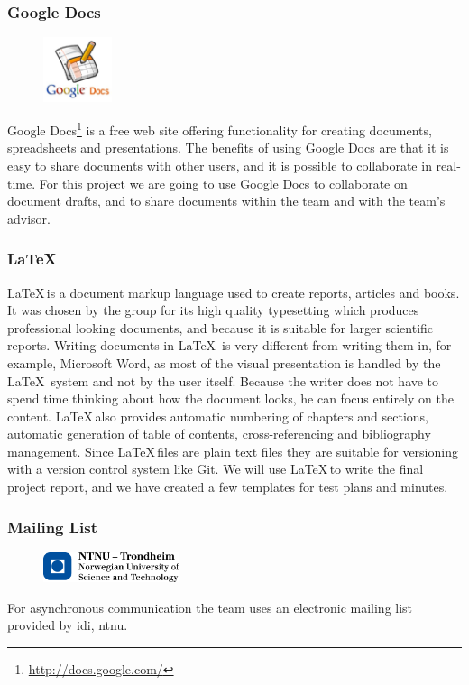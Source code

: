 \subsubsection{Google Docs}
\begin{figure}
	\vspace{-20pt}
	\includegraphics[width=2cm]{./planning/img/google_docs_logo}
	\vspace{-20pt}
\end{figure}
Google Docs\footnote{\url{http://docs.google.com/}} is a free web site offering
functionality for creating documents, spreadsheets and presentations.
The benefits of using Google Docs are that it is easy to share documents with other users, and
it is possible to collaborate in real-time. For this project we are going to use Google Docs
to collaborate on document drafts, and to share documents within the team and
with the team's advisor.

\subsubsection{\LaTeX}
\LaTeX \,is a document \gls{markup language} used to
create reports, articles and books. It was chosen by the group for its 
high quality typesetting which produces professional looking documents, and 
because it is suitable for larger scientific reports. 
Writing documents in \LaTeX \ is very different from writing them in, for example,
Microsoft Word, as most of the visual presentation is handled by the \LaTeX \ system 
and not by the user itself. Because the writer does not have to spend time
thinking about how the document looks, he can focus entirely on the content.
\LaTeX \,also provides automatic numbering of chapters and sections,
automatic generation of table of contents, cross-referencing and bibliography
management. Since \LaTeX \,files are plain text files they are suitable for versioning 
with a \gls{version control system} like Git. We will use \LaTeX \,to write the final project 
report, and we have created a few templates for test plans and minutes.

\subsubsection{Mailing List}
\begin{figure}
	\vspace{-20pt}
	\includegraphics[width=4cm]{./planning/img/ntnu_logo}
	\vspace{-20pt}
\end{figure}
For asynchronous communication the team uses an electronic mailing list
provided by \Gls{idi}, \Gls{ntnu}.

